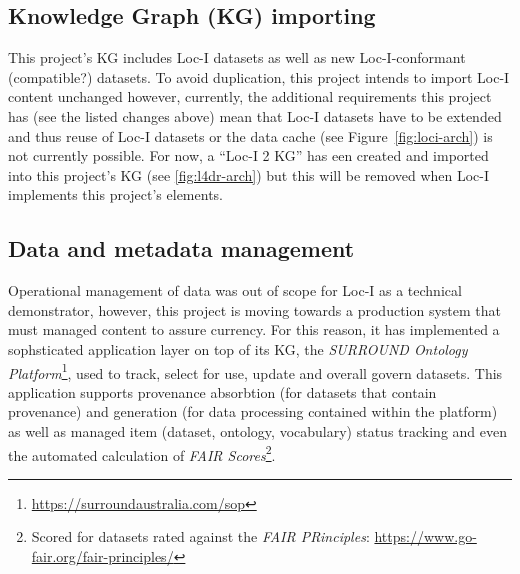 \documentclass[runningheads]{llncs}
\begin{document}
\subsection{Knowledge Graph (KG) importing}
This project's KG includes Loc-I datasets as well as new Loc-I-conformant (compatible?) datasets. To avoid duplication, this project intends to import Loc-I content unchanged however, 
currently, the additional requirements this project has (see the listed changes above) mean that Loc-I datasets have to be extended and thus reuse of Loc-I datasets
or the data cache (see Figure~\ref{fig:loci-arch}) is not currently possible. For now, a ``Loc-I 2 KG'' has een created and imported into this project's KG (see 
\ref{fig:l4dr-arch}) but this will be removed when Loc-I implements this project's elements.

\subsection{Data and metadata management}
Operational management of data was out of scope for Loc-I as a technical demonstrator, however, this project
is moving towards a production system that must managed content to assure currency. For this reason, it has implemented a sophsticated application layer on top of its KG, the 
\textit{SURROUND Ontology Platform}\footnote{\url{https://surroundaustralia.com/sop}},  used to track, select for use, update and overall govern datasets. This application
supports provenance absorbtion (for datasets that contain provenance) and generation (for data processing contained within the platform) as well as managed item (dataset, ontology, vocabulary)
status tracking and even the automated calculation of \textit{FAIR Scores}\footnote{Scored for datasets rated against the \textit{FAIR PRinciples}: \url{https://www.go-fair.org/fair-principles/}}.
\end{document}
